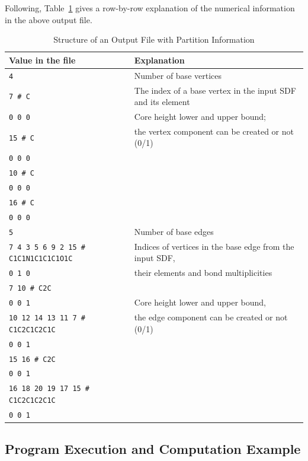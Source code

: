 \documentclass[11pt,titlepage,dvipdfmx,twoside]{book}
\begin{document}
Following, Table~\ref{tab:PartitionFormat}
gives a row-by-row explanation of the numerical information in the
above output file.


\bigskip
\begin{table}[H]
\begin{center} \caption{Structure of an Output File with Partition Information}
\label{tab:PartitionFormat}
  \begin{tabular}{l|l}
  Value in the file & Explanation \\ \hline \hline
{\tt  4} & Number of base vertices \\ \hline
{\tt  7 \# C} & The index of a base vertex in the input SDF and its element\\
{\tt  0 0 0} & Core height lower and upper bound; \\
{\tt  15 \# C} & \hspace{10mm} the vertex component can be created or not (0/1) \\
{\tt  0 0 0} & \\
{\tt  10 \# C} & \\
{\tt  0 0 0} & \\ 
{\tt  16 \# C} &\\ 
{\tt  0 0 0} & \\ \hline
{\tt  5} & Number of base edges　\\ \hline
{\tt  7 4 3 5 6 9 2 15 \# C1C1N1C1C1C1O1C} & Indices of vertices in the base edge from the input SDF,\\
{\tt  0 1 0} & \hspace{10mm} their elements and bond multiplicities　\\
{\tt  7 10 \# C2C} &\\ 
{\tt  0 0 1} &Core height lower and upper bound,\\
{\tt  10 12 14 13 11 7 \# C1C2C1C2C1C} &\hspace{10mm} the edge component can be created or not (0/1) \\
{\tt  0 0 1} & \\
{\tt  15 16 \# C2C} & \\
{\tt  0 0 1} & \\
{\tt  16 18 20 19 17 15 \# C1C2C1C2C1C} & \\
{\tt  0 0 1} & \\ \hline
  \end{tabular}
\end{center}
\end{table}



\subsection{Program Execution and Computation Example}
\label{chap:Example_p}
\end{document}
